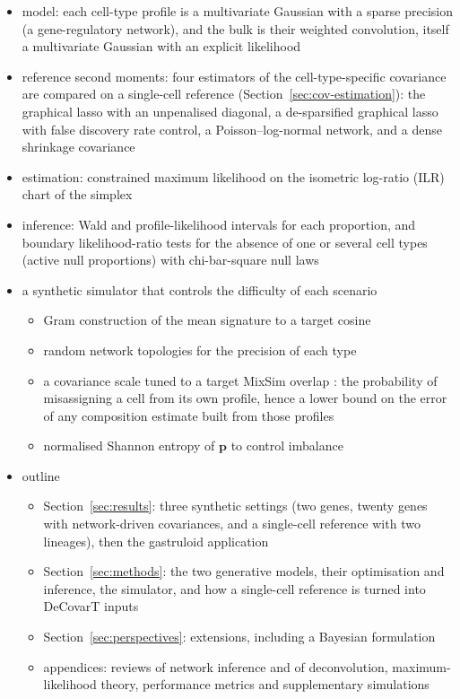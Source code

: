 \documentclass[pdflatex, sn-nature]{sn-jnl}
\theoremstyle{thmstyleone}%
\theoremstyle{thmstyletwo}%
\theoremstyle{thmstylethree}%
\begin{document}
\begin{itemize}
  \item model: each cell-type profile is a multivariate Gaussian with a sparse precision
        (a gene-regulatory network), and the bulk is their weighted convolution, itself a
        multivariate Gaussian with an explicit likelihood
        \cite{chassagnolDeCovarTMultidimensionalProbalistic2023}
  \item reference second moments: four estimators of the cell-type-specific covariance are
        compared on a single-cell reference (Section~\ref{sec:cov-estimation}): the graphical
        lasso with an unpenalised diagonal, a de-sparsified
        graphical lasso with false discovery rate control, a Poisson--log-normal network,
        and a dense shrinkage covariance
  \item estimation: constrained maximum likelihood on the isometric log-ratio (ILR) chart
        of the simplex \cite{egozcueIsometricLogratioTransformations2003}
  \item inference: Wald and profile-likelihood intervals for each proportion, and boundary
        likelihood-ratio tests for the absence of one or several cell types
        (active null proportions) with chi-bar-square null laws
        \cite{selfAsymptoticPropertiesMaximum1987}
  \item a synthetic simulator that controls the difficulty of each scenario
  \begin{itemize}
    \item Gram construction of the mean signature to a target cosine
    \item random network topologies for the precision of each type
    \item a covariance scale tuned to a target MixSim overlap
          \cite{melnykovMixSimPackageSimulating2012,rianiSimulatingMixturesMultivariate2015}:
          the probability of misassigning a cell from its own profile, hence a lower bound
          on the error of any composition estimate built from those profiles
    \item normalised Shannon entropy of \(\boldsymbol{p}\) to control imbalance
  \end{itemize}
  \item outline\label{sec:outline}
  \begin{itemize}
    \item Section~\ref{sec:results}: three synthetic settings (two genes, twenty genes with network-driven
          covariances, and a single-cell reference with two lineages), then the gastruloid application
    \item Section~\ref{sec:methods}: the two generative models, their optimisation and inference, the simulator,
          and how a single-cell reference is turned into DeCovarT inputs
    \item Section~\ref{sec:perspectives}: extensions, including a Bayesian formulation
    \item appendices: reviews of network inference and of deconvolution, maximum-likelihood
          theory, performance metrics and supplementary simulations
  \end{itemize}
\end{itemize}
\end{document}
